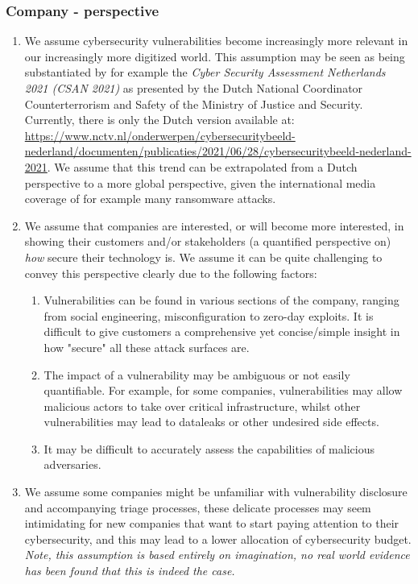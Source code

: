\subsubsection{Company - perspective}
\begin{enumerate}
	\item We assume cybersecurity vulnerabilities become increasingly more relevant in our increasingly more digitized world. This assumption may be seen as being substantiated by for example the \textit{Cyber Security Assessment Netherlands 2021 (CSAN 2021)} as presented by the Dutch National Coordinator Counterterrorism and Safety of the Ministry of Justice and Security. Currently, there is only the Dutch version available at: \url{https://www.nctv.nl/onderwerpen/cybersecuritybeeld-nederland/documenten/publicaties/2021/06/28/cybersecuritybeeld-nederland-2021}. We assume that this trend can be extrapolated from a Dutch perspective to a more global perspective, given the international media coverage of for example many ransomware attacks.
	\item We assume that companies are interested, or will become more interested, in showing their customers and/or stakeholders (a quantified perspective on) \textit{how} secure their technology is. We assume it can be quite challenging to convey this perspective clearly due to the following factors:
	\begin{enumerate}
		\item Vulnerabilities can be found in various sections of the company, ranging from social engineering, misconfiguration to zero-day exploits. It is difficult to give customers a comprehensive yet concise/simple insight in how "secure" all these attack surfaces are.
		\item The impact of a vulnerability may be ambiguous or not easily quantifiable. For example, for some companies, vulnerabilities may allow malicious actors to take over critical infrastructure, whilst other vulnerabilities may lead to dataleaks or other undesired side effects.
		\item It may be difficult to accurately assess the capabilities of malicious adversaries.
	\end{enumerate}
	\item We assume some companies might be unfamiliar with vulnerability disclosure and accompanying triage processes, these delicate processes may seem intimidating for new companies that want to start paying attention to their cybersecurity, and this may lead to a lower allocation of cybersecurity budget. \textit{Note, this assumption is based entirely on imagination, no real world evidence has been found that this is indeed the case.}
\end{enumerate}


